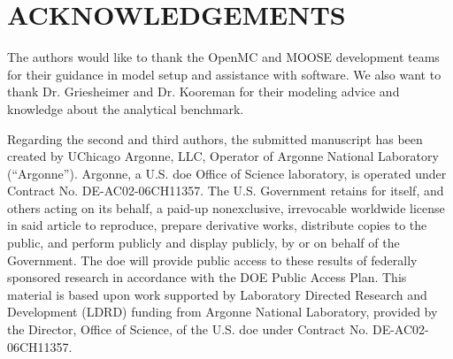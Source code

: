 \documentclass[letterpaper]{mc2023}
\begin{document}
\section*{ACKNOWLEDGEMENTS}
The authors would like to thank the OpenMC and MOOSE development teams for their guidance in model setup and assistance with software. We also want to thank
Dr. Griesheimer and Dr. Kooreman for their modeling advice and knowledge about the analytical benchmark.

Regarding the second and third authors, the submitted manuscript has been created by UChicago Argonne, LLC, Operator of Argonne National Laboratory (“Argonne”).
Argonne, a U.S. \gls{doe} Office of Science laboratory, is operated under Contract No. DE-AC02-06CH11357. The U.S. Government retains for itself, and others
acting on its behalf, a paid-up nonexclusive, irrevocable worldwide license in said article to reproduce, prepare derivative works, distribute copies to the
public, and perform publicly and display publicly, by or on behalf of the Government. The \gls{doe} will provide public access to these results of federally
sponsored research in accordance with the DOE Public Access Plan. This material is based upon work supported by Laboratory Directed Research and Development
(LDRD) funding from Argonne National Laboratory, provided by the Director, Office of Science, of the U.S. \gls{doe} under Contract No. DE-AC02-06CH11357.

\setlength{\baselineskip}{12pt}


\setlength{\baselineskip}{12pt}
\end{document}

